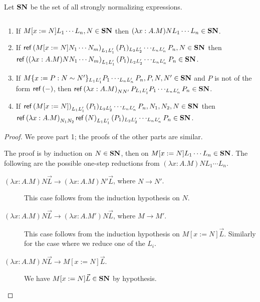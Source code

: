 
Let $\mathbf{SN}$ be the set of all strongly normalizing expressions.

\begin{lemma}
\label{lm:SN}
$ $
\begin{enumerate}
\item
\label{lm:SN1}
If $M[x:=N]L_1 \cdots L_n, N \in \mathbf{SN}$ then $(\lambda x:A.M)NL_1 \cdots L_n \in \mathbf{SN}$.
\item
\label{lm:SN2}
If $\mathsf{ref} \left( {M[x:=N]N_1 \cdots N_m} \right)_{L_1 L_1'} (P_1)_{L_2 L_2'} \cdots_{L_n L_n'} P_n, N \in \mathbf{SN}$ then \\
$\mathsf{ref} \left( {(\lambda x:A.M)NN_1 \cdots N_m} \right)_{L_1 L_1'} (P_1)_{L_2 L_2'} \cdots_{L_n L_n'} P_n \in \mathbf{SN}$.
\item
\label{lm:SN3}
If $M\{x:=P:N\sim N'\}_{L_1 L_1'} P_1 \cdots_{L_n L_n'} P_n, P, N, N' \in \mathbf{SN}$ and $P$ is not of the form $\mathsf{ref} \left( {-} \right)$, then $\mathsf{ref} \left( {\lambda x:A.M} \right)_{N N'} P_{L_1 L_1'} P_1 \cdots_{L_n L_n'} P_n \in \mathbf{SN}$.
\item
\label{lm:SN4}
If $\mathsf{ref} \left( {M[x:=N]} \right)_{L_1 L_1'} (P_1)_{L_2 L_2'} \cdots_{L_n L_n'} P_n, N_1, N_2, N \in \mathbf{SN}$ then \\
$\mathsf{ref} \left( {\lambda x:A.M} \right)_{N_1 N_2}\mathsf{ref} \left( {N} \right)_{L_1 L_1'} (P_1)_{L_2 L_2'} \cdots_{L_n L_n'} P_n \in \mathbf{SN}$.
\end{enumerate}
\end{lemma}

\begin{proof}
We prove part 1; the proofs of the other parts are similar.

The proof is by induction on $N \in \mathbf{SN}$, then on $M[x:=N]L_1 \cdots L_n \in \mathbf{SN}$.  The following are the possible one-step reductions from
$(\lambda x:A.M)NL_1 \cdots L_n$.

\begin{description}
\item[$(\lambda x:A.M)N\vec{L} \rightarrow (\lambda x:A.M)N'\vec{L}$, where $N \rightarrow N'$.]
This case follows from the induction hypothesis on $N$.

\item[$(\lambda x:A.M)N\vec{L} \rightarrow (\lambda x:A.M')N\vec{L}$, where $M \rightarrow M'$.]
This case follows from the induction hypothesis on $M[x:=N]\vec{L}$.  Similarly for the case where
we reduce one of the $L_i$.

\item[$(\lambda x:A.M)N\vec{L} \rightarrow M{[x:=N]}\vec{L}$.]  We have $M[x:=N]\vec{L} \in \mathbf{SN}$ by hypothesis.
\end{description}
\end{proof}

